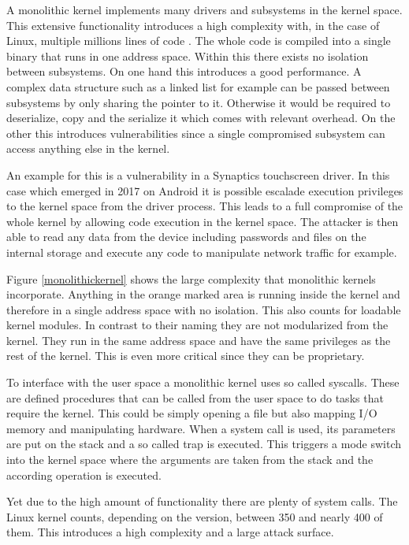 \documentclass[
a4paper,
12pt,
notitlepage,
parskip=half,
DIV=11,
]{scrbook}
\begin{document}
		A monolithic kernel implements many drivers and subsystems in the kernel space.
		This extensive functionality introduces a high complexity with, in the case of Linux, multiple millions lines of code \citep{journals/jss/IsraeliF10}.
		The whole code is compiled into a single binary that runs in one address space.
		Within this there exists no isolation between subsystems.
		On one hand this introduces a good performance.
		A complex data structure such as a linked list for example can be passed between subsystems by only sharing the pointer to it.
		Otherwise it would be required to deserialize, copy and the serialize it which comes with relevant overhead.
		On the other this introduces vulnerabilities since a single compromised subsystem can access anything else in the kernel.
		
		An example for this is a vulnerability in a Synaptics touchscreen driver.
		In this case which emerged in 2017 on Android it is possible escalade execution privileges to the kernel space from the driver process.
		This leads to a full compromise of the whole kernel by allowing code execution in the kernel space.
		The attacker is then able to read any data from the device including passwords and files on the internal storage and execute any code to manipulate network traffic for example. \citep{cve-2017-0581}
		
		Figure \ref{monolithickernel} shows the large complexity that monolithic kernels incorporate.
		Anything in the orange marked area is running inside the kernel and therefore in a single address space with no isolation.
		This also counts for loadable kernel modules.
		In contrast to their naming they are not modularized from the kernel.
		They run in the same address space and have the same privileges as the rest of the kernel.
		This is even more critical since they can be proprietary.
		
		To interface with the user space a monolithic kernel uses so called syscalls.
		These are defined procedures that can be called from the user space to do tasks that require the kernel.
		This could be simply opening a file but also mapping I/O memory and manipulating hardware.
		When a system call is used, its parameters are put on the stack and a so called trap is executed.
		This triggers a mode switch into the kernel space where the arguments are taken from the stack and the according operation is executed. \citep{Tanenbaum2001}
		
		Yet due to the high amount of functionality there are plenty of system calls.
		The Linux kernel counts, depending on the version, between 350 \citep{journals/jss/IsraeliF10} and nearly 400 \citep{syscalls} of them.
		This introduces a high complexity and a large attack surface.
		
\end{document}
